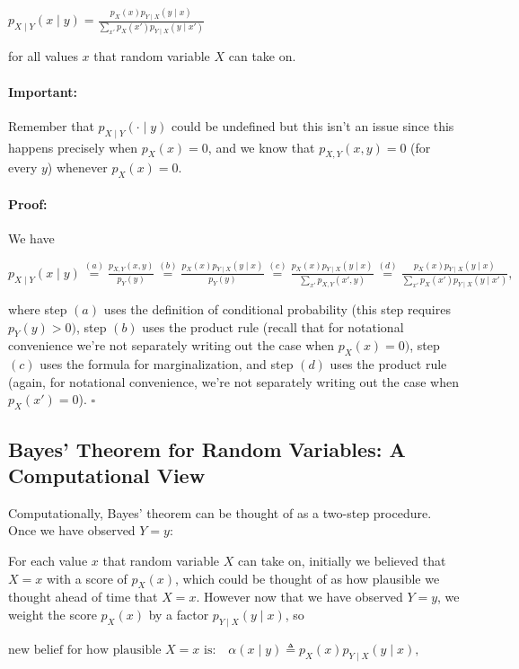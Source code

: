 \documentclass[6008notes.tex]{subfiles}
\begin{document}
{\centering$p_{X\mid Y}(x\mid y)=\frac{p_{X}(x)p_{Y\mid X}(y\mid x)}{\sum _{ x'}p_{X}( x')p_{Y\mid X}(y\mid x')}$ \par}
 
for all values $x$ that random variable $X$ can take on.

\paragraph{Important:} Remember that $p_{X\mid Y}(\cdot \mid y)$ could be undefined but this isn't an issue since this happens precisely when $p_X(x)=0$, and we know that $p_{X,Y}(x,y)=0$ (for every $y$) whenever $p_X(x)=0$.

\paragraph{Proof:} We have

{\centering$p_{X\mid Y}(x\mid y)\overset {(a)}{=}\frac{p_{X,Y}(x,y)}{p_{Y}(y)}\overset {(b)}{=}\frac{p_{X}(x)p_{Y\mid X}(y\mid x)}{p_{Y}(y)}\overset {(c)}{=}\frac{p_{X}(x)p_{Y\mid X}(y\mid x)}{\sum _{ x'}p_{X,Y}( x',y)}\overset {(d)}{=}\frac{p_{X}(x)p_{Y\mid X}(y\mid x)}{\sum _{ x'}p_{X}( x')p_{Y\mid X}(y\mid x')},$ \par}
 
where step $(a)$ uses the definition of conditional probability (this step requires $p_Y(y)>0)$, step $(b)$ uses the product rule (recall that for notational convenience we're not separately writing out the case when $p_X(x)=0)$, step $(c)$ uses the formula for marginalization, and step $(d)$ uses the product rule (again, for notational convenience, we're not separately writing out the case when $p_X(x')=0$). $\square$

\subsection{Bayes' Theorem for Random Variables: A Computational View}

Computationally, Bayes' theorem can be thought of as a two-step procedure. Once we have observed $Y=y$:

For each value $x$ that random variable $X$ can take on, initially we believed that $X=x$ with a score of $p_X(x)$, which could be thought of as how plausible we thought ahead of time that $X=x$. However now that we have observed $Y=y$, we weight the score $p_X(x)$ by a factor $p_{Y\mid X}(y\mid x)$, so

{\centering$\text {new belief for how plausible }X=x\text { is:}\quad \alpha (x\mid y)\triangleq p_{X}(x)p_{Y\mid X}(y\mid x),$ \par}
\end{document}
